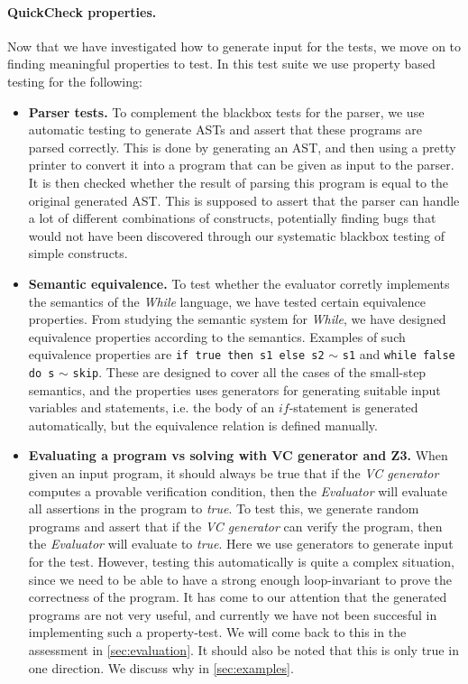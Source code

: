 \paragraph{QuickCheck properties.}
Now that we have investigated how to generate input for the tests, we move on to finding meaningful properties to test. In this test suite we use property based testing for the following:
\begin{itemize}
	\item \textbf{Parser tests.}
	To complement the blackbox tests for the parser, we use automatic testing to generate ASTs and assert that these programs are parsed correctly. This is done by generating an AST, and then using a pretty printer to convert it into a program that can be given as input to the parser. It is then checked whether the result of parsing this program is equal to the original generated AST. This is supposed to assert that the parser can handle a lot of different combinations of constructs, potentially finding bugs that would not have been discovered through our systematic blackbox testing of simple constructs.
	\item \textbf{Semantic equivalence.}
  To test whether the evaluator corretly implements the semantics of the \textit{While} language, we have tested certain equivalence properties. From studying the semantic system for \textit{While}, we have designed equivalence properties according to the semantics. 
	Examples of such equivalence properties are \texttt{if true then s1 else s2} $\sim$ \texttt{s1} and \texttt{while false do s} $\sim$ \texttt{skip}.
  These are designed to cover all the cases of the small-step semantics, and the properties uses generators for generating suitable input variables and statements, i.e. the body of an $if$-statement is generated automatically, but the equivalence relation is defined manually.
	\item \textbf{Evaluating a program vs solving with VC generator and Z3.}
	When given an input program, it should always be true that if the \textit{VC generator} computes a provable verification condition, then the \textit{Evaluator} will evaluate all assertions in the program to \textit{true}.
	To test this, we generate random programs and assert that if the \textit{VC generator} can verify the program, then the \textit{Evaluator} will evaluate to \textit{true}. 
	Here we use generators to generate input for the test. 
	However, testing this automatically is quite a complex situation, since we need to be able to have a strong enough loop-invariant to prove the correctness of the program. 
	It has come to our attention that the generated programs are not very useful, and currently we have not been succesful in implementing such a property-test. We will come back to this in the assessment in \cref{sec:evaluation}.
	It should also be noted that this is only true in one direction. We discuss why in \cref{sec:examples}.
\end{itemize}

